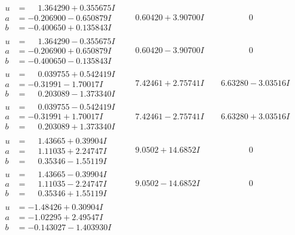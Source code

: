 \documentclass[1p]{elsarticle_modified}
\theoremstyle{definition}
\begin{document}
$$\begin{array}{c|c|c}
\begin{aligned}
u &= \phantom{-}1.364290 + 0.355675 I \\
a &= -0.206900 - 0.650879 I \\
b &= -0.400650 + 0.135843 I\end{aligned}
 & \phantom{-}0.60420 + 3.90700 I & \phantom{-0.000000 } 0 \\ \hline\begin{aligned}
u &= \phantom{-}1.364290 - 0.355675 I \\
a &= -0.206900 + 0.650879 I \\
b &= -0.400650 - 0.135843 I\end{aligned}
 & \phantom{-}0.60420 - 3.90700 I & \phantom{-0.000000 } 0 \\ \hline\begin{aligned}
u &= \phantom{-}0.039755 + 0.542419 I \\
a &= -0.31991 - 1.70017 I \\
b &= \phantom{-}0.203089 - 1.373340 I\end{aligned}
 & \phantom{-}7.42461 + 2.75741 I & \phantom{-}6.63280 - 3.03516 I \\ \hline\begin{aligned}
u &= \phantom{-}0.039755 - 0.542419 I \\
a &= -0.31991 + 1.70017 I \\
b &= \phantom{-}0.203089 + 1.373340 I\end{aligned}
 & \phantom{-}7.42461 - 2.75741 I & \phantom{-}6.63280 + 3.03516 I \\ \hline\begin{aligned}
u &= \phantom{-}1.43665 + 0.39904 I \\
a &= \phantom{-}1.11035 + 2.24747 I \\
b &= \phantom{-}0.35346 - 1.55119 I\end{aligned}
 & \phantom{-}9.0502 + 14.6852 I & \phantom{-0.000000 } 0 \\ \hline\begin{aligned}
u &= \phantom{-}1.43665 - 0.39904 I \\
a &= \phantom{-}1.11035 - 2.24747 I \\
b &= \phantom{-}0.35346 + 1.55119 I\end{aligned}
 & \phantom{-}9.0502 - 14.6852 I & \phantom{-0.000000 } 0 \\ \hline\begin{aligned}
u &= -1.48426 + 0.30904 I \\
a &= -1.02295 + 2.49547 I \\
b &= -0.143027 - 1.403930 I\end{aligned}

\end{array}$$
\end{document}
